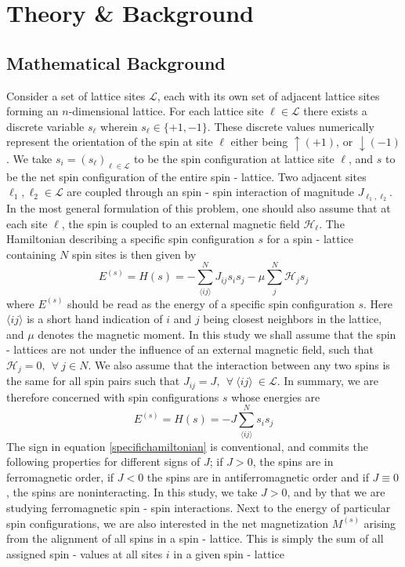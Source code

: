 \section{Theory \& Background}

\subsection{Mathematical Background}
Consider a set of lattice sites $\mathcal{L}$, each with its own set of adjacent lattice sites forming an $n$-dimensional lattice. For each lattice site $\ell \in \mathcal{L}$ there exists a discrete variable $s_\ell$ wherein $s_\ell \in \{+1,-1\}$. These discrete values numerically represent the orientation of the spin at site $\ell$ either being $\uparrow (+1)$, or $\downarrow (-1)$. We take $s_i = (s_\ell)_{\ell\in\mathcal{L}}$ to be the spin configuration at lattice site $\ell$, and $s$ to be the net spin configuration of the entire spin - lattice. Two adjacent sites $\ell_1, \ell_2 \in \mathcal{L}$ are coupled through an spin - spin interaction of magnitude $J_{\ell_1,\ell_2}$. In the most general formulation of this problem, one should also assume that at each site $\ell$, the spin is coupled to an external magnetic field $\mathcal{H}_\ell$. The Hamiltonian describing a specific spin configuration $s$ for a spin - lattice containing $N$ spin sites is then given by
\begin{equation}
    E^{(s)} = H(s) = -\sum_{\langle ij \rangle}^{N}J_{ij}s_is_j - \mu \sum_{j}^{N}\mathcal{H}_js_j
    \label{mostgeneralhamiltonian}
\end{equation}
where $E^{(s)}$ should be read as the energy of a specific spin configuration $s$. Here $\langle ij \rangle$ is a short hand indication of $i$ and $j$ being closest neighbors in the lattice, and $\mu$ denotes the magnetic moment. In this study we shall assume that the spin - lattices are not under the influence of an external magnetic field, such that $\mathcal{H}_j = 0,\ \ \forall\ j \in N$. We also assume that the interaction between any two spins is the same for all spin pairs such that $J_{ij} = J,\ \ \forall\ \langle ij \rangle \ \in \mathcal{L}$. In summary, we are therefore concerned with spin configurations $s$ whose energies are 
\begin{equation}
    E^{(s)} = H(s) = -J\sum_{\langle ij \rangle}^{N} s_is_j
    \label{specifichamiltonian}
\end{equation}
The sign in equation \eqref{specifichamiltonian} is conventional, and commits the following properties for different signs of $J$; if $J > 0$, the spins are in ferromagnetic order, if $J < 0$ the spins are in antiferromagnetic order and if $J \equiv 0$, the spins are noninteracting. In this study, we take $J > 0$, and by that we are studying ferromagnetic spin - spin interactions. Next to the energy of particular spin configurations, we are also interested in the net magnetization $M^{(s)}$ arising from the alignment of all spins in a spin - lattice. This is simply the sum of all assigned spin - values at all sites $i$ in a given spin - lattice

